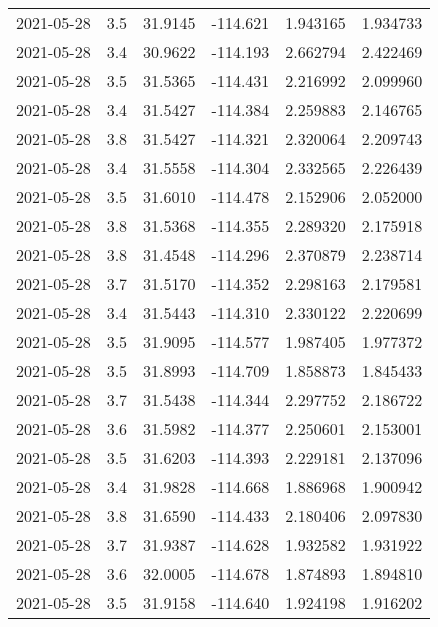 \begin{tabular}{lrrrrr}
2021-05-28 &       3.5 &  31.9145 &  -114.621 &         1.943165 &         1.934733 \\
2021-05-28 &       3.4 &  30.9622 &  -114.193 &         2.662794 &         2.422469 \\
2021-05-28 &       3.5 &  31.5365 &  -114.431 &         2.216992 &         2.099960 \\
2021-05-28 &       3.4 &  31.5427 &  -114.384 &         2.259883 &         2.146765 \\
2021-05-28 &       3.8 &  31.5427 &  -114.321 &         2.320064 &         2.209743 \\
2021-05-28 &       3.4 &  31.5558 &  -114.304 &         2.332565 &         2.226439 \\
2021-05-28 &       3.5 &  31.6010 &  -114.478 &         2.152906 &         2.052000 \\
2021-05-28 &       3.8 &  31.5368 &  -114.355 &         2.289320 &         2.175918 \\
2021-05-28 &       3.8 &  31.4548 &  -114.296 &         2.370879 &         2.238714 \\
2021-05-28 &       3.7 &  31.5170 &  -114.352 &         2.298163 &         2.179581 \\
2021-05-28 &       3.4 &  31.5443 &  -114.310 &         2.330122 &         2.220699 \\
2021-05-28 &       3.5 &  31.9095 &  -114.577 &         1.987405 &         1.977372 \\
2021-05-28 &       3.5 &  31.8993 &  -114.709 &         1.858873 &         1.845433 \\
2021-05-28 &       3.7 &  31.5438 &  -114.344 &         2.297752 &         2.186722 \\
2021-05-28 &       3.6 &  31.5982 &  -114.377 &         2.250601 &         2.153001 \\
2021-05-28 &       3.5 &  31.6203 &  -114.393 &         2.229181 &         2.137096 \\
2021-05-28 &       3.4 &  31.9828 &  -114.668 &         1.886968 &         1.900942 \\
2021-05-28 &       3.8 &  31.6590 &  -114.433 &         2.180406 &         2.097830 \\
2021-05-28 &       3.7 &  31.9387 &  -114.628 &         1.932582 &         1.931922 \\
2021-05-28 &       3.6 &  32.0005 &  -114.678 &         1.874893 &         1.894810 \\
2021-05-28 &       3.5 &  31.9158 &  -114.640 &         1.924198 &         1.916202 \\

\end{tabular}
